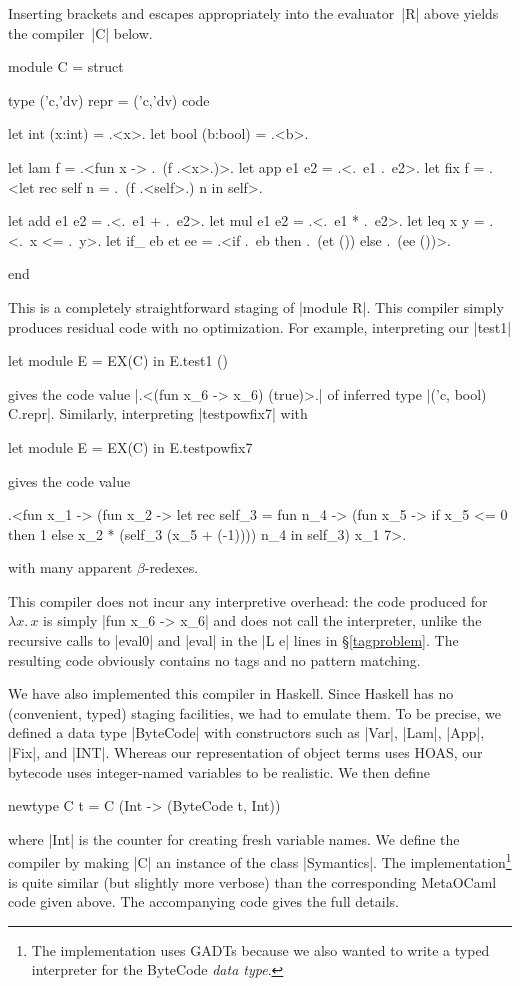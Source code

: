 \documentclass[preprint]{sigplanconf}
\newcommand{\fun}[1]{\mathopen{\lambda\mathord{#1}.\,}}
\begin{document}
Inserting brackets and escapes appropriately into the
evaluator~|R| above yields the compiler~|C| below.
\begin{code}
module C = struct

  type ('c,'dv) repr = ('c,'dv) code

  let int (x:int)   = .<x>.
  let bool (b:bool) = .<b>.

  let lam f         = .<fun x -> .~(f .<x>.)>.
  let app e1 e2     = .<.~e1 .~e2>.
  let fix f = 
    .<let rec self n = .~(f .<self>.) n in self>.

  let add e1 e2     = .<.~e1 + .~e2>.
  let mul e1 e2     = .<.~e1 * .~e2>.
  let leq x y       = .<.~x <= .~y>.
  let if_ eb et ee = 
    .<if .~eb then .~(et ()) else .~(ee ())>.

end
\end{code}
This is a completely straightforward staging of
|module R|.
This compiler simply produces
residual code with no optimization. For example, interpreting our |test1|
\begin{code}
let module E = EX(C) in E.test1 ()
\end{code}
gives the code value |.<(fun x_6 -> x_6) (true)>.|
of inferred type |('c, bool) C.repr|.  Similarly, interpreting |testpowfix7|
with
\begin{code}
let module E = EX(C) in E.testpowfix7
\end{code}
gives the code value
\begin{code}
.<fun x_1 -> (fun x_2 ->
  let rec self_3 = fun n_4 ->
   (fun x_5 -> if x_5 <= 0 then 1 
               else x_2 * (self_3 (x_5 + (-1))))
   n_4
  in self_3) x_1 7>.
\end{code}
with many apparent $\beta$-redexes.

This compiler does not incur
any interpretive overhead: the
code produced for $\fun{x}x$ is simply |fun x_6 -> x_6| and does not
  call the interpreter, unlike the recursive calls to |eval0| and
  |eval| in the |L e| lines in \S\ref{tagproblem}.
The resulting code obviously contains no tags and no pattern matching.

We have also implemented this compiler in Haskell. Since Haskell
has no (convenient, typed) staging facilities, we had to emulate
them. To be precise, we defined a data type |ByteCode| with
constructors such as |Var|, |Lam|, |App|, |Fix|, and |INT|.
Whereas our representation of object terms uses HOAS,
our bytecode uses integer-named
variables to be realistic. We then define 
\begin{code}
newtype C t = C (Int -> (ByteCode t, Int)) 
\end{code}
where |Int| is the counter for creating fresh variable
names. We define the compiler by making |C| an instance of the
class |Symantics|. The implementation\footnote{The implementation uses
GADTs because we also wanted to write a typed interpreter for 
the \textsf{ByteCode} \emph{data type}.} is quite similar (but slightly more
verbose) than the corresponding MetaOCaml code given above. The
accompanying code gives the full details.
\end{document}
